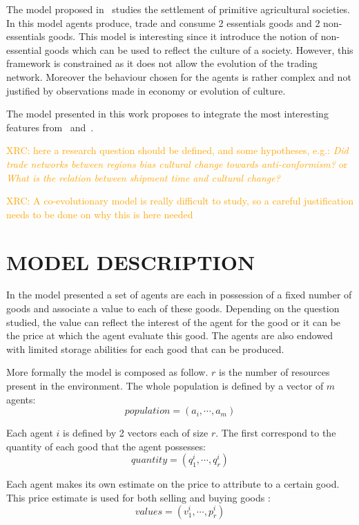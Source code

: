 \documentclass{wscpaperproc}
\newcommand{\memo}[2]{\textcolor{#1}{#2}}
\newcommand{\xrc}[1]{\memo{orange}{XRC: #1\\}}
\begin{document}
The model proposed in~\cite{macmillan_agent-based_2008} studies the settlement of primitive agricultural societies. In this model agents produce, trade and consume 2 essentials goods and 2 non-essentials goods. This model is interesting since it introduce the notion of non-essential goods which can be used to reflect the culture of a society. However, this framework is constrained as it does not allow the evolution of the trading network. Moreover the behaviour chosen for the agents is rather complex and not justified by observations made in economy or evolution of culture.

The model presented in this work proposes to integrate the most interesting features from~\cite{bentley_specialisation_2005} and~\cite{macmillan_agent-based_2008}.

\xrc{here a research question should be defined, and some hypotheses, e.g.: \emph{Did trade networks between regions bias cultural change towards anti-conformism?} or \emph{What is the relation between shipment time and cultural change?}}

\xrc{A co-evolutionary model is really difficult to study, so a careful justification needs to be done on why this is here needed}

\section{MODEL DESCRIPTION}

In the model presented a set of agents are each in possession of a fixed number of goods and associate a value to each of these goods. Depending on the question studied, the value can reflect the interest of the agent for the good or it can be the price at which the agent evaluate this good. The agents are also endowed with limited storage abilities for each good that can be produced. 


More formally the model is composed as follow. $r$ is the number of resources present in the environment. The whole population is defined by a vector of $m$ agents: 
$$ population = (a_i, \cdots ,a_m) $$
		
Each agent $i$ is defined by 2 vectors each of size $r$. The first correspond to the quantity of each good that the agent possesses: $$ quantity = (q^i_1,\cdots,q^i_r) $$

Each agent makes its own estimate on the price to attribute to a certain good. This price estimate is used for both selling and buying goods :
$$ values = (v^i_1,\cdots,p^i_r) $$
\end{document}
